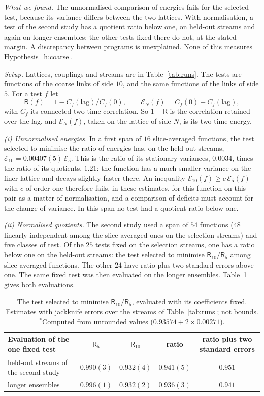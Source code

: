 \emph{What we found.} The unnormalised comparison of energies fails for the selected test, because its variance differs
between the two lattices. With normalisation, a test of the second study has a quotient ratio below
one, on held-out streams and again on longer ensembles; the other tests fixed there do not, at the stated
margin. A discrepancy between programs is unexplained. None of this measures
Hypothesis~\ref{h:coarse}.

\emph{Setup.} Lattices, couplings and streams are in Table~\ref{tab:runs}. The tests are functions of the
coarse links of side $10$, and the same functions of the links of side $5$. For a test $f$ let
\[
\mathsf R(f)=1-C_f(\mathrm{lag})/C_f(0),\qquad \mathcal E_N(f)=C_f(0)-C_f(\mathrm{lag}),
\]
with $C_f$ its connected two-time correlation. So $1-\mathsf R$ is the correlation retained over the lag, and
$\mathcal E_N(f)$, taken on the lattice of side $N$, is its two-time energy.

\emph{{\upshape(i)} Unnormalised energies.} In a first span of $16$ slice-averaged functions, the test
selected to minimise the ratio of energies has, on the held-out streams,
$\mathcal E_{10}=0.00407(5)\,\mathcal E_5$. This is the ratio of its stationary variances, $0.0034$, times the
ratio of its quotients, $1.21$: the function has a much smaller variance on the finer lattice and decays
slightly faster there. An inequality $\mathcal E_{10}(f)\ge c\,\mathcal E_5(f)$ with $c$ of order one
therefore fails, in these estimates, for this function on this pair as a matter of normalisation, and a comparison of deficits
must account for the change of variance. In this span no test had a quotient ratio below one.

\emph{{\upshape(ii)} Normalised quotients.} The second study used a span of $54$ functions ($48$ linearly
independent among the slice-averaged ones on the selection streams) and five classes of test. Of the $25$
tests fixed on the selection streams, one has a ratio below one on the held-out streams: the test selected to
minimise $\mathsf R_{10}/\mathsf R_5$ among slice-averaged functions. The other $24$ have ratio plus two
standard errors above one. The same fixed test was then evaluated on the longer ensembles.
Table~\ref{tab:cross} gives both evaluations.

\begin{table}[ht]
\centering\small
\begin{tabular}{@{}lcccc@{}}
\toprule
Evaluation of the one fixed test & $\mathsf R_5$ & $\mathsf R_{10}$ & ratio & ratio plus two standard errors \\
\midrule
held-out streams of the second study & $0.990(3)$ & $0.932(4)$ & $0.941(5)$ & $0.951$ \\
longer ensembles & $0.996(1)$ & $0.932(2)$ & $0.936(3)$ & $0.941$\rlap{$^{*}$} \\
\bottomrule
\end{tabular}
\caption{The test selected to minimise $\mathsf R_{10}/\mathsf R_5$, evaluated with its coefficients fixed.
Estimates with jackknife errors over the streams of Table~\ref{tab:runs}; not bounds. $^{*}$Computed from
unrounded values ($0.93574+2\times0.00271$).}\label{tab:cross}
\end{table}

